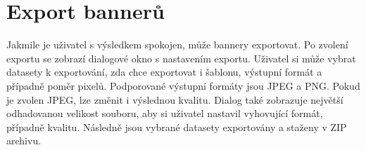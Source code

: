 \section{Export bannerů}
    Jakmile je uživatel s výsledkem spokojen, může bannery exportovat. Po zvolení exportu se zobrazí dialogové okno s nastavením exportu.
    Uživatel si může vybrat datasety k exportování, zda chce exportovat i šablonu, výstupní formát a případně poměr pixelů.
    Podporované výstupní formáty jsou JPEG a PNG. Pokud je zvolen JPEG, lze změnit i výslednou kvalitu.
    Dialog také zobrazuje největší odhadovanou velikost souboru, aby si uživatel nastavil vyhovující formát, případně kvalitu.
    Následně jsou vybrané datasety exportovány a staženy v ZIP archivu.




\endinput